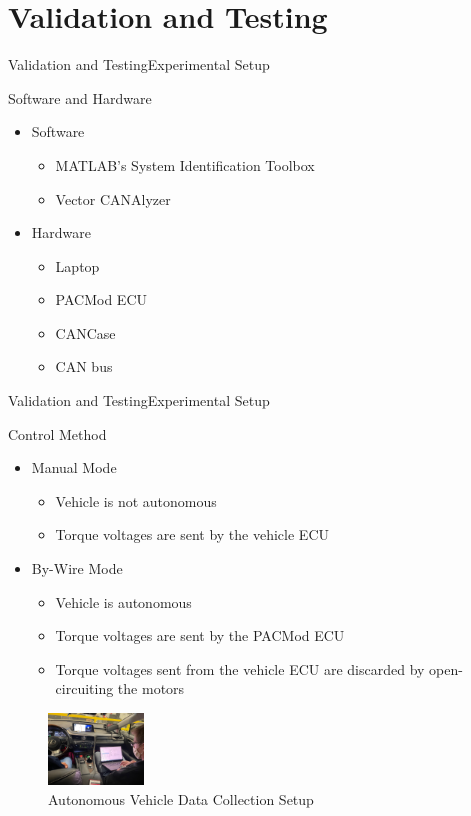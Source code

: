 \documentclass{beamer}
\begin{document}
\section{Validation and Testing}

\begin{frame}{Validation and Testing}{Experimental Setup}
  \begin{block}{Software and Hardware}
 \begin{itemize}
        \item Software
        \begin{itemize}
        \small
        \item MATLAB's System Identification Toolbox
        \item Vector CANAlyzer
        \end{itemize}
	\item Hardware
	\begin{itemize}
	\small
	\item Laptop
	\item PACMod ECU
	\item CANCase 
	\item CAN bus
	\end{itemize}
\end{itemize}
  \end{block}
\end{frame}

\begin{frame}{Validation and Testing}{Experimental Setup}
	\begin{block}{Control Method}
		\begin{itemize}
			\item Manual Mode
			\begin{itemize}
				\item Vehicle is not autonomous
				\item Torque voltages are sent by the vehicle ECU
			\end{itemize}
			\item By-Wire Mode
			\begin{itemize}
				\item Vehicle is autonomous
				\item Torque voltages are sent by the PACMod ECU
				\item Torque voltages sent from the vehicle ECU are discarded by open-circuiting the motors
			\end{itemize}
		\end{itemize}
		\begin{figure}
			\centering
    			\captionsetup{justification=centering, margin=3cm}
    			\includegraphics[width=1in]{figs/img/picturesVisitToAStuff/dataColletionSetup1-20211007}
    			\caption{Autonomous Vehicle Data Collection Setup}
    			\label{fig:vehicleSetup}
		\end{figure}
	\end{block}
\end{frame}
\end{document}
